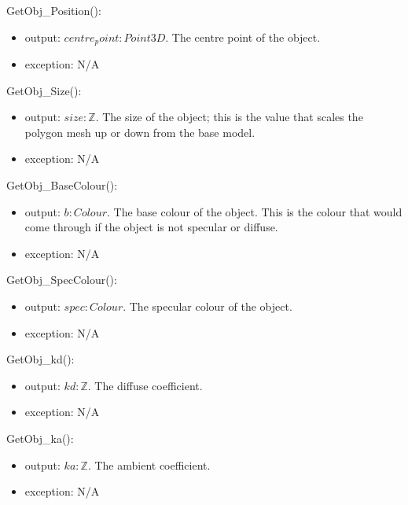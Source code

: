 \documentclass[12pt, titlepage]{article}
\begin{document}
\noindent GetObj\_Position():
\begin{itemize}
	\item output: $centre_point : Point3D$. The centre point of the object.
	\item exception: N/A
\end{itemize}

\noindent GetObj\_Size():
\begin{itemize}
	\item output: $size : \mathbb{Z}$. The size of the object; this is the 
	value that scales the polygon mesh up or down from the base model.
	\item exception: N/A
\end{itemize}

\noindent GetObj\_BaseColour():
\begin{itemize}
	\item output: $b : Colour$. The base colour of the object. This is the 
	colour that would come through if the object is not specular or diffuse.
	\item exception: N/A
\end{itemize}

\noindent GetObj\_SpecColour():
\begin{itemize}
	\item output: $spec : Colour$. The specular colour of the object.
	\item exception: N/A
\end{itemize}

\noindent GetObj\_kd():
\begin{itemize}
	\item output: $kd : \mathbb{Z}$. The diffuse coefficient.
	\item exception: N/A
\end{itemize}

\noindent GetObj\_ka():
\begin{itemize}
	\item output: $ka : \mathbb{Z}$. The ambient coefficient.
	\item exception: N/A
\end{itemize}
\end{document}
